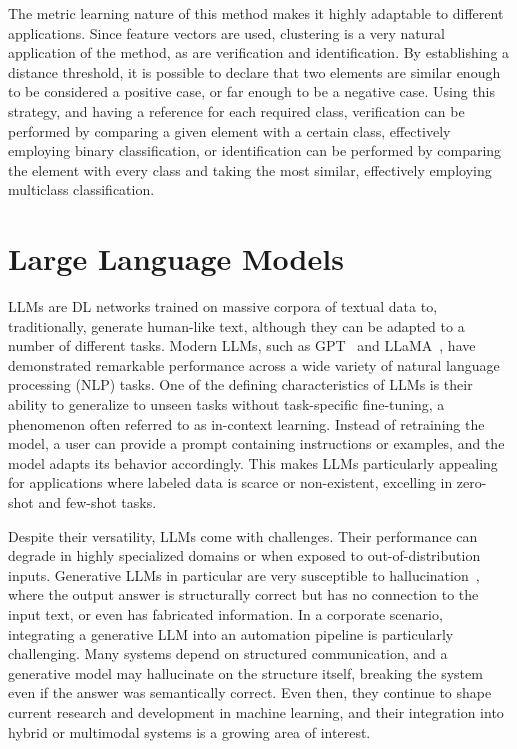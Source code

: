 The metric learning nature of this method makes it highly adaptable to different applications. Since feature vectors are used, clustering is a very natural application of the method, as are verification and identification. By establishing a distance threshold, it is possible to declare that two elements are similar enough to be considered a positive case, or far enough to be a negative case. Using this strategy, and having a reference for each required class, verification can be performed by comparing a given element with a certain class, effectively employing binary classification, or identification can be performed by comparing the element with every class and taking the most similar, effectively employing multiclass classification.

\section{Large Language Models}

\glspl{LLM} are \gls{DL} networks trained on massive corpora of textual data to, traditionally, generate human-like text, although they can be adapted to a number of different tasks. Modern LLMs, such as GPT~\cite{brown_language_2020} and LLaMA~\cite{touvron_llama_2023}, have demonstrated remarkable performance across a wide variety of natural language processing (NLP) tasks. One of the defining characteristics of LLMs is their ability to generalize to unseen tasks without task-specific fine-tuning, a phenomenon often referred to as in-context learning. Instead of retraining the model, a user can provide a prompt containing instructions or examples, and the model adapts its behavior accordingly. This makes LLMs particularly appealing for applications where labeled data is scarce or non-existent, excelling in zero-shot and few-shot tasks.

Despite their versatility, LLMs come with challenges. Their performance can degrade in highly specialized domains or when exposed to out-of-distribution inputs. Generative LLMs in particular are very susceptible to hallucination~\cite{ji_survey_2023}, where the output answer is structurally correct but has no connection to the input text, or even has fabricated information. In a corporate scenario, integrating a generative LLM into an automation pipeline is particularly challenging. Many systems depend on structured communication, and a generative model may hallucinate on the structure itself, breaking the system even if the answer was semantically correct. Even then, they continue to shape current research and development in machine learning, and their integration into hybrid or multimodal systems is a growing area of interest.

